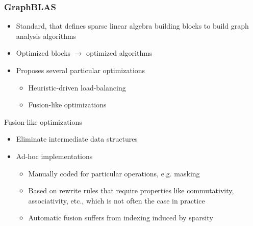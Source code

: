 \documentclass[xcolor=table]{beamer}
\begin{document}
\begin{frame}[c,fragile] \frametitle{GraphBLAS}




    




\begin{itemize}
    \item Standard, that defines sparse linear algebra building blocks to build graph analysis algorithms
    \vfill
    \item Optimized blocks $\to$ optimized algorithms
    \vfill
    \item Proposes several particular optimizations
    \vfill
    \begin{itemize}
        \item Heuristic-driven load-balancing
        \vfill
        \item \textcolor{forestgreen(web)}{Fusion-like optimizations}
    \end{itemize}
\end{itemize}

\end{frame}

\begin{frame}[fragile]{Fusion-like optimizations}

\begin{itemize}
            \item Eliminate intermediate data structures
            \vfill
            \item Ad-hoc implementations
            \vfill
            \begin{itemize}
                \item Manually coded for particular operations, e.g. masking
                \vfill
                \item Based on rewrite rules that require properties like commutativity, associativity, etc., which is not often the case in practice
                \vfill
                \item Automatic fusion suffers from indexing induced by sparsity
            \end{itemize}
        \end{itemize}
    
\end{frame}
\end{document}
